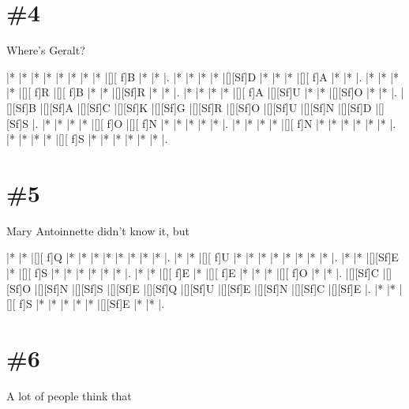 \documentclass[letterpaper]{article}
\begin{document}
\section*{\#4}
Where's Geralt?
\vspace*{1em}
\begin{Puzzle}{11}{8}
|*        |*        |*        |*        |*        |*        |*        |*        |[][ f]B  |*        |*        |. 
|*        |*        |*        |*        |[][Sf]D  |*        |*        |*        |[][ f]A  |*        |*        |.  
|*        |*        |*        |*        |[][ f]R  |[][ f]B  |*        |*        |[][Sf]R  |*        |*        |.
|*        |*        |*        |*        |[][ f]A  |[][Sf]U  |*        |*        |[][Sf]O  |*        |*        |.  
|[][Sf]B  |[][Sf]A  |[][Sf]C  |[][Sf]K  |[][Sf]G  |[][Sf]R  |[][Sf]O  |[][Sf]U  |[][Sf]N  |[][Sf]D  |[][Sf]S  |.
|*        |*        |*        |*        |[][ f]O  |[][ f]N  |*        |*        |*        |*        |*        |. 
|*        |*        |*        |*        |[][ f]N  |*        |*        |*        |*        |*        |*        |.
|*        |*        |*        |*        |[][ f]S  |*        |*        |*        |*        |*        |*        |.
\end{Puzzle}

\section*{\#5}
Mary Antoinnette didn't know it, but

\vspace*{1em}
\begin{Puzzle}{11}{6}
|*        |*        |[][ f]Q  |*        |*        |*        |*        |*        |*        |*        |*        |. 
|*        |*        |[][ f]U  |*        |*        |*        |*        |*        |*        |*        |*        |.  
|*        |*        |[][Sf]E  |*        |[][ f]S  |*        |*        |*        |*        |*        |*        |.
|*        |*        |[][ f]E  |*        |[][ f]E  |*        |*        |*        |[][ f]O  |*        |*        |.  
|[][Sf]C  |[][Sf]O  |[][Sf]N  |[][Sf]S  |[][Sf]E  |[][Sf]Q  |[][Sf]U  |[][Sf]E  |[][Sf]N  |[][Sf]C  |[][Sf]E  |.
|*        |*        |[][ f]S  |*        |*        |*        |*        |*        |[][Sf]E  |*        |*        |. 
\end{Puzzle}

\section*{\#6}
A lot of people think that
\end{document}
